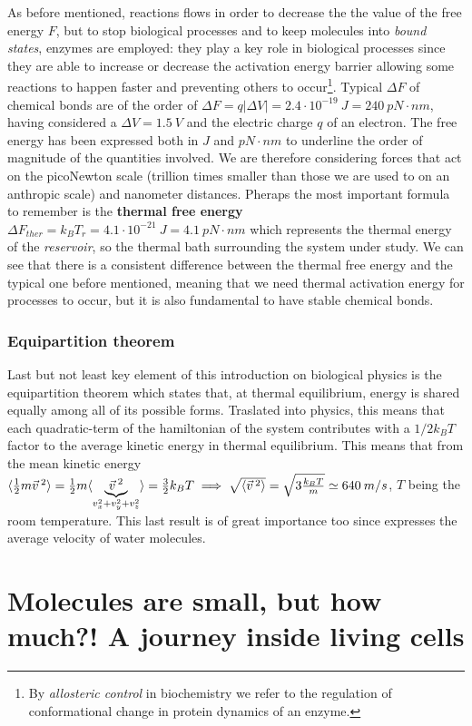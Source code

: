 \documentclass[../main/main.tex]{subfiles}
\begin{document}
As before mentioned, reactions flows in order to decrease the the value of the free energy $F$, but to stop biological processes and to keep molecules into \emph{bound states}, enzymes are employed: they play a key role in biological processes since they are able to increase or decrease the activation energy barrier allowing some reactions to happen faster and preventing others to occur\footnote{By \emph{allosteric control} in biochemistry we refer to the regulation of conformational change in protein dynamics of an enzyme.}.
Typical $\Delta F$ of chemical bonds are of the order of $\Delta F=q|\Delta V|=2.4\cdot10^{-19}\:J=240\:pN\cdot nm$, having considered a $\Delta V=1.5\:V$ and the electric charge $q$ of an electron. The free energy has been expressed both in $J$ and $pN\cdot nm$ to underline the order of magnitude of the quantities involved. We are therefore considering forces that act on the picoNewton scale (trillion times smaller than those we are used to on an anthropic scale) and nanometer distances.
Pheraps the most important formula to remember is the \textbf{thermal free energy} $\Delta F_{ther}=k_B T_r=4.1\cdot10^{-21}\:J=4.1\:pN\cdot nm$ which represents the thermal energy of the \emph{reservoir}, so the thermal bath surrounding the system under study. We can see that there is a consistent difference between the thermal free energy and the typical one before mentioned, meaning that we need thermal activation energy for processes to occur, but it is also fundamental to have stable chemical bonds.  

\subsection{Equipartition theorem}
Last but not least key element of this introduction on biological physics is the equipartition theorem which states that, at thermal equilibrium, energy is shared equally among all of its possible forms. Traslated into physics, this means that each quadratic-term of the hamiltonian of the system contributes with a $1/2 k_B T$ factor to the average kinetic energy in thermal equilibrium. 
This means that from the mean kinetic energy $\langle \frac{1}{2}m\vec{v}^{\:2} \rangle=\frac{1}{2}m\langle \underbrace{\vec{v}^{\:2}}_{v_x^2+v_y^2+v_z^2} \rangle=\frac{3}{2}k_B T\implies \sqrt{\langle \vec{v}^{\:2} \rangle}=\sqrt{3\frac{k_B T}{m}}\simeq 640\:m/s$, $T$ being the room temperature. This last result is of great importance too since expresses the average velocity of water molecules. 

\chapter{Molecules are small, but how much?! A journey inside living cells}
\end{document}

